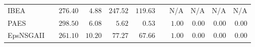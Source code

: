 \begin{table}
{\begin{tabular}{
        |l||
        l|
        r
        r|
        r
        r
        ||l|
        r
        r|
        r
        r|
      }
      IBEA       &                           & $276.40$                         & $4.88$                           & $247.52$        & $119.63$                         &                                 & N/A               & N/A             & N/A                 & N/A              \\
      PAES       &                           & $\mathbf{298.50}$                & $\mathbf{6.08}$                  & $\mathbf{5.62}$ & $\mathbf{0.53}$                  &                                 & $1.00$            & $0.00$          & $0.00$              & $0.00$           \\
      EpsNSGAII  &                           & $261.10$                         & $10.20$                          & $77.27$         & $67.66$                          &                                 & $1.00$            & $0.00$          & $0.00$              & $0.00$           \\
      \hline
    \end{tabular}%
  }
\end{table}

